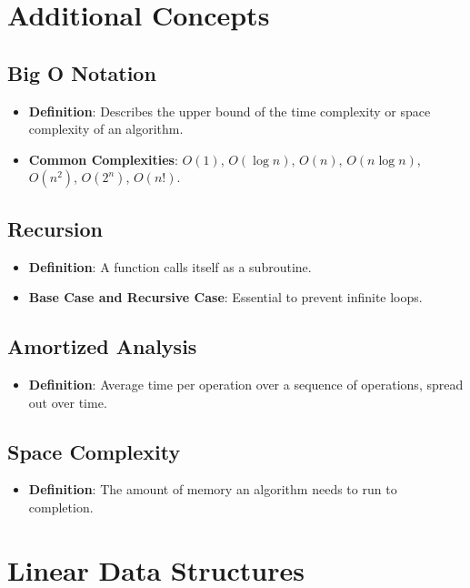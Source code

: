 \documentclass{article}
\begin{document}
\section{Additional Concepts}

\subsection{Big O Notation}
\begin{itemize}
    \item \textbf{Definition}: Describes the upper bound of the time complexity or space complexity of an algorithm.
    \item \textbf{Common Complexities}: $O(1)$, $O(\log n)$, $O(n)$, $O(n \log n)$, $O(n^2)$, $O(2^n)$, $O(n!)$.
\end{itemize}

\subsection{Recursion}
\begin{itemize}
    \item \textbf{Definition}: A function calls itself as a subroutine.
    \item \textbf{Base Case and Recursive Case}: Essential to prevent infinite loops.
\end{itemize}

\subsection{Amortized Analysis}
\begin{itemize}
    \item \textbf{Definition}: Average time per operation over a sequence of operations, spread out over time.
\end{itemize}

\subsection{Space Complexity}
\begin{itemize}
    \item \textbf{Definition}: The amount of memory an algorithm needs to run to completion.
\end{itemize}
\section{Linear Data Structures}
\end{document}
